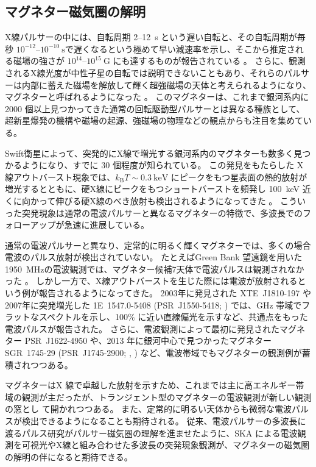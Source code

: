 \subsection{マグネター磁気圏の解明} \label{transients.s3.magnetars}
X線パルサーの中には、自転周期 2--12~s という遅い自転と、その自転周期が毎秒 $10^{-12}$--$10^{-10}~\text{s}$で遅くなるという極めて早い減速率を示し、そこから推定される磁場の強さが $10^{14}$--$10^{15}~\text{G}$ にも達するものが報告されている \citep{2008A&ARv..15..225M}。
さらに、観測されるX線光度が中性子星の自転では説明できないこともあり、それらのパルサーは内部に蓄えた磁場を解放して輝く超強磁場の天体と考えられるようになり、マグネターと呼ばれるようになった \citep{1995MNRAS.275..255T}。
このマグネターは、これまで銀河系内に 2000 個以上見つかってきた通常の回転駆動型パルサーとは異なる種族として、超新星爆発の機構や磁場の起源、強磁場の物理などの観点からも注目を集めている。

Swift衛星によって、突発的にX線で増光する銀河系内のマグネターも数多く見つかるようになり、すでに 30 個程度が知られている。
この発見をもたらした X 線アウトバースト現象では、$k_\text{B}T \sim 0.3~\text{keV}$ にピークをもつ星表面の熱的放射が増光するとともに、硬X線にピークをもつショートバーストを頻発し 100~keV 近くに向かって伸びる硬X線のべき放射も検出されるようになってきた \citep{2010ApJ...715..665E}。
こういった突発現象は通常の電波パルサーと異なるマグネターの特徴で、多波長でのフォローアップが急速に進展している。

通常の電波パルサーと異なり、定常的に明るく輝くマグネターでは、多くの場合電波のパルス放射が検出されていない。
たとえばGreen Bank 望遠鏡を用いた 1950~MHzの電波観測では、マグネター候補7天体で電波パルスは観測されなかった \citep{2012ApJ...744...97L}。
しかし一方で、X線アウトバーストを生じた際には電波が放射されるという例が報告されるようになってきた。
2003年に発見された XTE~J1810-197 \citep{2006Natur.442..892C} や2007年に突発増光した 1E~1547.0-5408 (PSR~J1550-5418; \citealt{2008ApJ...679..681C}) では、GHz 帯域でフラットなスペクトルを示し、100\% に近い直線偏光を示すなど、共通点をもった電波パルスが報告された。
さらに、電波観測によって最初に発見されたマグネター PSR~J1622-4950 \citep{2010ApJ...721L..33L}や、2013 年に銀河中心で見つかったマグネター SGR~1745-29 (PSR~J1745-2900; \citealt{2013ApJ...770L..23M}, \citealt{2014ApJ...780L...3S}) など、電波帯域でもマグネターの観測例が蓄積されつつある。

マグネターはX 線で卓越した放射を示すため、これまでは主に高エネルギー帯域の観測が主だったが、トランジェント型のマグネターの電波観測が新しい観測の窓とし
て開かれつつある。
また、定常的に明るい天体からも微弱な電波パルスが検出できるようになることも期待される。
従来、電波パルサーの多波長に渡るパルス研究がパルサー磁気圏の理解を進ませたように、SKA による電波観測を可視光やX線と組み合わせた多波長の突発現象観測が、マグネターの磁気圏の解明の伴になると期待できる。